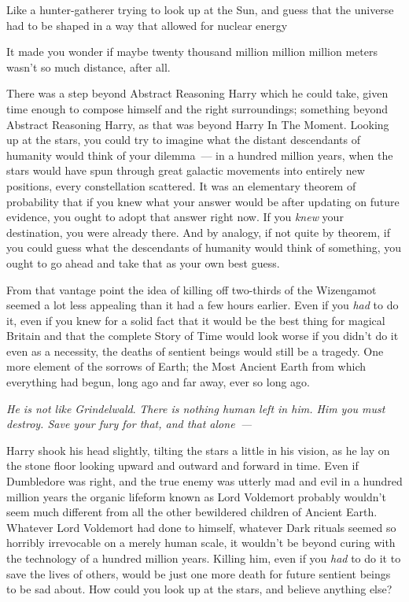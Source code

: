 Like a hunter-gatherer trying to look up at the Sun, and guess that the
universe had to be shaped in a way that allowed for nuclear energy{\el}

It made you wonder if maybe twenty thousand million million million meters
wasn't so much distance, after all.

There was a step beyond Abstract Reasoning Harry which he could take, given
time enough to compose himself and the right surroundings; something beyond
Abstract Reasoning Harry, as that was beyond Harry In The Moment. Looking up at
the stars, you could try to imagine what the distant descendants of humanity
would think of your dilemma~--- in a hundred million years, when the stars would
have spun through great galactic movements into entirely new positions, every
constellation scattered. It was an elementary theorem of probability that if
you knew what your answer would be after updating on future evidence, you ought
to adopt that answer right now. If you \emph{knew} your destination, you were
already there. And by analogy, if not quite by theorem, if you could guess what
the descendants of humanity would think of something, you ought to go ahead and
take that as your own best guess.

From that vantage point the idea of killing off two-thirds of the Wizengamot
seemed a lot less appealing than it had a few hours earlier. Even if you
\emph{had} to do it, even if you knew for a solid fact that it would be the
best thing for magical Britain and that the complete Story of Time would look
worse if you didn't do it{\el} even as a necessity, the deaths of sentient
beings would still be a tragedy. One more element of the sorrows of Earth; the
Most Ancient Earth from which everything had begun, long ago and far away, ever
so long ago.

\emph{He is not like Grindelwald}. \emph{There is nothing human left in him.
Him you must destroy. Save your fury for that, and that alone~--- }

Harry shook his head slightly, tilting the stars a little in his vision, as he
lay on the stone floor looking upward and outward and forward in time. Even if
Dumbledore was right, and the true enemy was utterly mad and evil{\el} in a
hundred million years the organic lifeform known as Lord Voldemort probably
wouldn't seem much different from all the other bewildered children of Ancient
Earth. Whatever Lord Voldemort had done to himself, whatever Dark rituals
seemed so horribly irrevocable on a merely human scale, it wouldn't be beyond
curing with the technology of a hundred million years. Killing him, even if you
\emph{had} to do it to save the lives of others, would be just one more death
for future sentient beings to be sad about. How could you look up at the stars,
and believe anything else?

